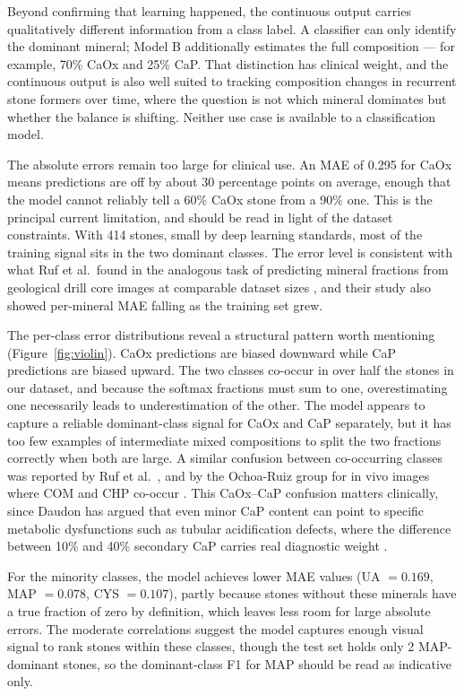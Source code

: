 \documentclass[10pt,twocolumn]{article}
\begin{document}
Beyond confirming that learning happened, the continuous output carries qualitatively different information from a class label. A classifier can only identify the dominant mineral; Model B additionally estimates the full composition --- for example, 70\% CaOx and 25\% CaP. That distinction has clinical weight, and the continuous output is also well suited to tracking composition changes in recurrent stone formers over time, where the question is not which mineral dominates but whether the balance is shifting. Neither use case is available to a classification model.

The absolute errors remain too large for clinical use. An MAE of 0.295 for CaOx means predictions are off by about 30 percentage points on average, enough that the model cannot reliably tell a 60\% CaOx stone from a 90\% one. This is the principal current limitation, and should be read in light of the dataset constraints. With 414 stones, small by deep learning standards, most of the training signal sits in the two dominant classes. The error level is consistent with what Ruf et al.\ found in the analogous task of predicting mineral fractions from geological drill core images at comparable dataset sizes \cite{Ruf2024}, and their study also showed per-mineral MAE falling as the training set grew.

The per-class error distributions reveal a structural pattern worth mentioning (Figure~\ref{fig:violin}). CaOx predictions are biased downward while CaP predictions are biased upward. The two classes co-occur in over half the stones in our dataset, and because the softmax fractions must sum to one, overestimating one necessarily leads to underestimation of the other. The model appears to capture a reliable dominant-class signal for CaOx and CaP separately, but it has too few examples of intermediate mixed compositions to split the two fractions correctly when both are large. A similar confusion between co-occurring classes was reported by Ruf et al.\ \cite{Ruf2024}, and by the Ochoa-Ruiz group for in vivo images where COM and CHP co-occur \cite{LopezTiro2024}. This CaOx--CaP confusion matters clinically, since Daudon has argued that even minor CaP content can point to specific metabolic dysfunctions such as tubular acidification defects, where the difference between 10\% and 40\% secondary CaP carries real diagnostic weight \cite{Daudon2014}.

For the minority classes, the model achieves lower MAE values (UA $= 0.169$, MAP $= 0.078$, CYS $= 0.107$), partly because stones without these minerals have a true fraction of zero by definition, which leaves less room for large absolute errors. The moderate correlations suggest the model captures enough visual signal to rank stones within these classes, though the test set holds only 2 MAP-dominant stones, so the dominant-class F1 for MAP should be read as indicative only.
 
\end{document}
